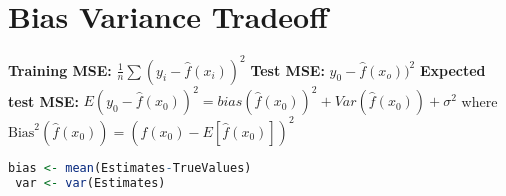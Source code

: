 \section{Bias Variance Tradeoff}
 \textbf{Training MSE:} $\frac{1}{n} \sum (y_i-\hat f(x_i))^2 $ \textbf{Test MSE:} $y_0 - \hat f(x_o))^2$ \textbf{Expected test MSE:} $E(y_0- \hat f(x_0))^2 = bias(\hat f(x_0))^2 + Var(\hat f(x_0)) + \sigma^2$ where $\text{Bias}^2(\hat f(x_0)) = (f(x_0)-E[\hat f(x_0)])^2$
 \begin{lstlisting}[language=R]
 bias <- mean(Estimates-TrueValues)
 var <- var(Estimates)
 \end{lstlisting}